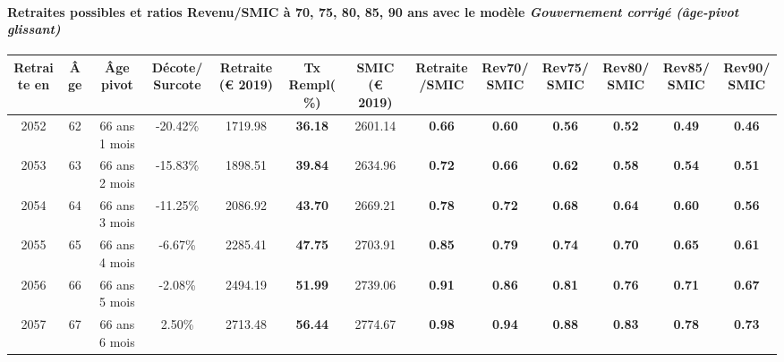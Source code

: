 \paragraph{Retraites possibles et ratios Revenu/SMIC à 70, 75, 80, 85, 90 ans avec le modèle \emph{Gouvernement corrigé (âge-pivot glissant)}}  
 
{ \scriptsize \begin{center} 
\begin{tabular}[htb]{|c|c||c|c||c|c||c||c|c|c|c|c|c|} 
\hline 
 Retraite en &  Âge &  Âge pivot &  Décote/Surcote &  Retraite (\euro{} 2019) &  Tx Rempl(\%) &  SMIC (\euro{} 2019) &  Retraite/SMIC &  Rev70/SMIC &  Rev75/SMIC &  Rev80/SMIC &  Rev85/SMIC &  Rev90/SMIC \\ 
\hline \hline 
 2052 &  62 &  66 ans 1 mois &  -20.42\% &  1719.98 &  {\bf 36.18} &  2601.14 &  {\bf {\color{red} 0.66}} &  {\bf {\color{red} 0.60}} &  {\bf {\color{red} 0.56}} &  {\bf {\color{red} 0.52}} &  {\bf {\color{red} 0.49}} &  {\bf {\color{red} 0.46}} \\ 
\hline 
 2053 &  63 &  66 ans 2 mois &  -15.83\% &  1898.51 &  {\bf 39.84} &  2634.96 &  {\bf {\color{red} 0.72}} &  {\bf {\color{red} 0.66}} &  {\bf {\color{red} 0.62}} &  {\bf {\color{red} 0.58}} &  {\bf {\color{red} 0.54}} &  {\bf {\color{red} 0.51}} \\ 
\hline 
 2054 &  64 &  66 ans 3 mois &  -11.25\% &  2086.92 &  {\bf 43.70} &  2669.21 &  {\bf {\color{red} 0.78}} &  {\bf {\color{red} 0.72}} &  {\bf {\color{red} 0.68}} &  {\bf {\color{red} 0.64}} &  {\bf {\color{red} 0.60}} &  {\bf {\color{red} 0.56}} \\ 
\hline 
 2055 &  65 &  66 ans 4 mois &  -6.67\% &  2285.41 &  {\bf 47.75} &  2703.91 &  {\bf {\color{red} 0.85}} &  {\bf {\color{red} 0.79}} &  {\bf {\color{red} 0.74}} &  {\bf {\color{red} 0.70}} &  {\bf {\color{red} 0.65}} &  {\bf {\color{red} 0.61}} \\ 
\hline 
 2056 &  66 &  66 ans 5 mois &  -2.08\% &  2494.19 &  {\bf 51.99} &  2739.06 &  {\bf {\color{red} 0.91}} &  {\bf {\color{red} 0.86}} &  {\bf {\color{red} 0.81}} &  {\bf {\color{red} 0.76}} &  {\bf {\color{red} 0.71}} &  {\bf {\color{red} 0.67}} \\ 
\hline 
 2057 &  67 &  66 ans 6 mois &  2.50\% &  2713.48 &  {\bf 56.44} &  2774.67 &  {\bf {\color{red} 0.98}} &  {\bf {\color{red} 0.94}} &  {\bf {\color{red} 0.88}} &  {\bf {\color{red} 0.83}} &  {\bf {\color{red} 0.78}} &  {\bf {\color{red} 0.73}} \\ 
\hline 
\hline 
\end{tabular} 
\end{center} } 
